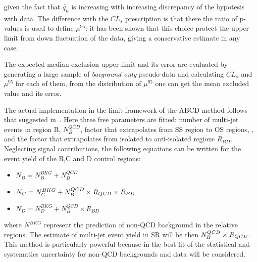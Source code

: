 given the fact that $\tilde{q_{\mu}}$ is increasing with increasing discrepancy of the hypotesis with data.
The difference with the $CL_{s}$ prescription is that there the ratio of p-values is used to define $\mu^{95}$: 
it has been shown that this choice protect the upper limit from down fluctuation of the data, giving a conservative
estimate in any case.
%
%
%	
%

The expected median exclusion upper-limit and its error are evaluated by generating a large sample of \emph{bacground only}
pseudo-data and calculating $CL_s$ and $\mu^{95}$ for each of them, from the distribution of  $\mu^{95}$ one can get the mean
excluded value and its error.

The actual implementation in the limit framework of the ABCD method follows that suggested in~\cite{ABCD}.
Here three free parameters are fitted: number of multi-jet events in region B, $N_{B}^{QCD}$, factor that extrapolates from SS region to OS regions, \rqcd, and the factor that 
extrapolates from isolated to anti-isolated regions $R_{BD}$. Neglecting signal contributions, the following 
equations can be written for the event yield of the B,C and D control regions:
\begin{itemize}
\item[] $N_{B} = N_{B}^{BKG} + N_{B}^{QCD}$
\item[] $N_{C} = N_{C}^{BKG} +  N_{B}^{QCD} \times R_{QCD} \times R_{BD} $
\item[] $N_{D} =  N_{D}^{BKG} + N_{B}^{QCD} \times  R_{BD} $
\end{itemize}
where $N^{BKG}$ represent the prediction of  non-QCD background in the relative regions.
The estimate of multi-jet event yield in SR will be then $ N_{B}^{QCD} \times R_{QCD} $. This method is 
particularly powerful because in the best fit of \rqcd the statistical 
and systematics uncertainty for non-QCD backgrounds and data will be considered.


